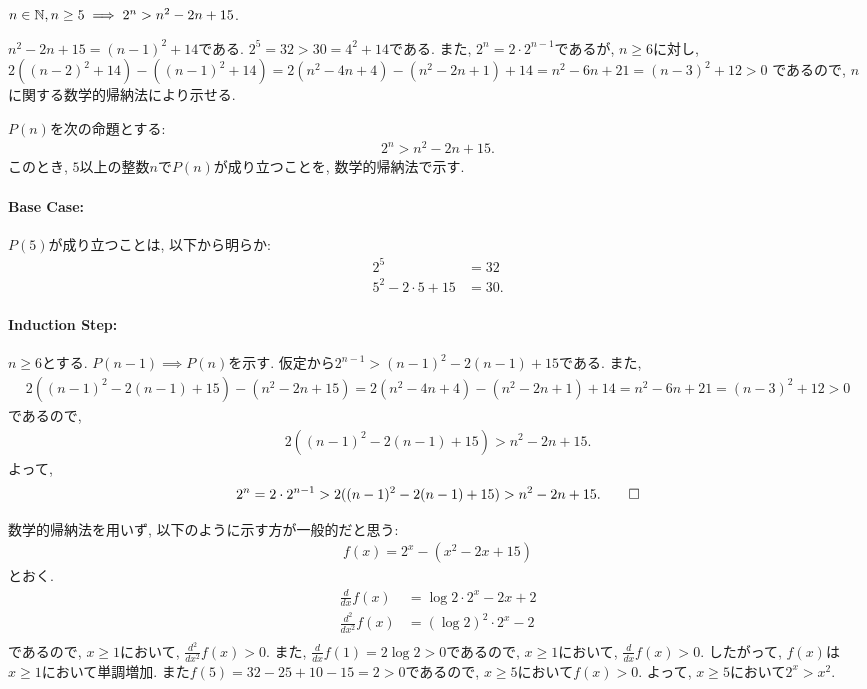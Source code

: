 \begin{prop}
  \label{p:20230816}
$n\in\mathbb{N}, n\geq 5\implies 2^n> n^2-2n+15$.
\end{prop}
\begin{proof**}
  $n^2-2n+15=(n-1)^2+14$である.
  $2^5=32 > 30=4^2+14$である.
  また,
  $2^n=2\cdot 2^{n-1}$であるが,
  $n\geq 6$に対し,
  $2((n-2)^2+14)-((n-1)^2+14)=2(n^2-4n+4)-(n^2-2n+1)+14=n^2-6n+21=(n-3)^2+12>0$
  であるので,
  $n$に関する数学的帰納法により示せる.
\end{proof**}
\begin{proof*}
  $P(n)$を次の命題とする:
  \begin{align*}
    2^n > n^2-2n+15
    .
  \end{align*}
  このとき,
  $5$以上の整数$n$で$P(n)$が成り立つことを,
  数学的帰納法で示す.

  \paragraph{Base Case:}
  $P(5)$が成り立つことは, 以下から明らか:
  \begin{align*}
    2^5&=32\\
    5^2-2\cdot 5+15&=30.
  \end{align*}
  \paragraph{Induction Step:}
  $n\geq 6$とする.
  $P(n-1)\implies P(n)$を示す.
  仮定から$2^{n-1} > (n-1)^2-2(n-1)+15$である.
  また,
  \begin{align*}
    2((n-1)^2-2(n-1)+15)-(n^2-2n+15)=2(n^2-4n+4)-(n^2-2n+1)+14=n^2-6n+21=(n-3)^2+12>0
  \end{align*}
  であるので,
  \begin{align*}
    2((n-1)^2-2(n-1)+15)>n^2-2n+15.
  \end{align*}
  よって,
  \begin{align*}
    2^n=2\cdot 2^{n-1}>2((n-1)^2-2(n-1)+15)>n^2-2n+15
    .\qedhere
  \end{align*}
\end{proof*}

\begin{rem}
  数学的帰納法を用いず, 以下のように示す方が一般的だと思う:
  \begin{align*}
    f(x)=2^x-(x^2-2x+15)
  \end{align*}
  とおく.
  \begin{align*}
    \frac{d}{dx}f(x)&=\log 2 \cdot 2^x-2x+2\\
    \frac{d^2}{dx^2}f(x)&=(\log 2)^2 \cdot 2^x-2\\
  \end{align*}
  であるので, $x\geq 1$において,
  $\frac{d^2}{dx^2}f(x)>0$.
  また, $\frac{d}{dx}f(1)=2\log 2>0$であるので,
  $x\geq 1$において,
  $\frac{d}{dx}f(x)> 0$.
  したがって, $f(x)$は$x\geq 1$において単調増加.
  また$f(5)=32-25+10-15=2>0$であるので,
  $x\geq 5$において$f(x) > 0$.
  よって, $x\geq 5$において$2^x > x^2$.
\end{rem}

